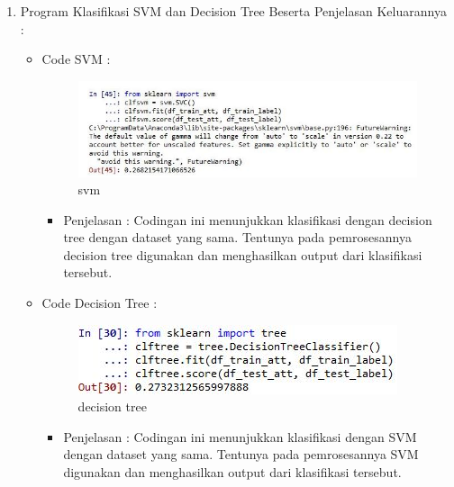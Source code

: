 \begin{enumerate}
\par
\par
\item Program Klasifikasi SVM dan Decision Tree Beserta Penjelasan Keluarannya :
\begin{itemize}
\item Code SVM :
\par
\begin{figure}[ht]
\centering
\includegraphics[scale=0.2]{figures/svm1.jpg}
\caption{svm}
\label{contoh}
\end{figure}
\par
\begin{itemize}
\item Penjelasan : Codingan ini menunjukkan klasifikasi dengan decision tree dengan dataset yang sama. Tentunya pada pemrosesannya decision tree digunakan dan menghasilkan output dari klasifikasi tersebut.
\par 
\par
\end{itemize}
\item Code Decision Tree :
\par
\begin{figure}[ht]
\centering
\includegraphics[scale=0.2]{figures/dec1.jpg}
\caption{decision tree}
\label{contoh}
\end{figure}
\par
\begin{itemize}
\item Penjelasan : Codingan ini menunjukkan klasifikasi dengan SVM dengan dataset yang sama. Tentunya pada pemrosesannya SVM digunakan dan menghasilkan output dari klasifikasi tersebut.
\par
\par
\end{itemize}
\end{itemize}




\end{enumerate}
